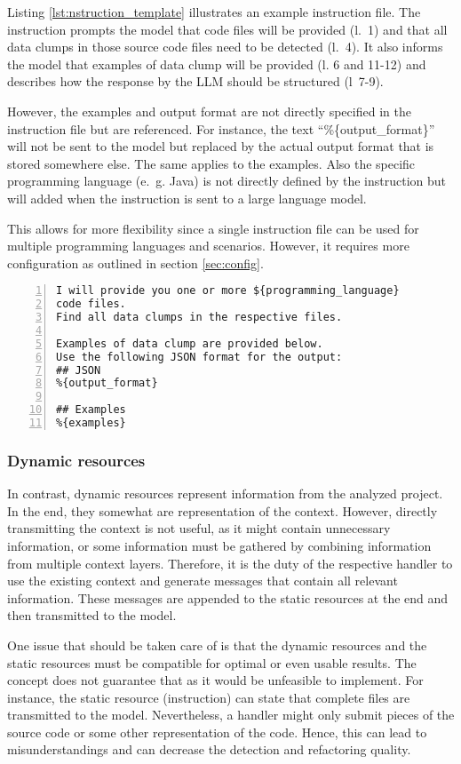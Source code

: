 Listing \ref{lst:nstruction_template} illustrates an example instruction file.  The instruction prompts the model that code files will be provided (l.~1) and that all data clumps in those source code files need to be detected (l.~4). It also informs the model that examples of data clump will be provided (l. 6 and 11-12) and describes how the response by the \ac{LLM} should be structured (l~7-9). 

However, the examples and output format are not directly specified in the instruction file but are referenced. For instance, the text \enquote{\%\{output\_format\}} will not be sent to the model but replaced by the actual output format that is stored somewhere else. The same applies to the examples. Also the specific programming language (e.~g. Java) is not directly defined by the instruction but will added when the instruction is sent to a large language model.

This allows for more flexibility since a single instruction file can be used for multiple programming languages and scenarios. However, it requires more configuration as outlined in section \ref{sec:config}.
\begin{lstlisting}[caption={Instruction file example}, label={lst:nstruction_template}, captionpos=b, numbers=left, ]
I will provide you one or more ${programming_language}
code files.
Find all data clumps in the respective files.

Examples of data clump are provided below.
Use the following JSON format for the output:
## JSON
%{output_format}

## Examples
%{examples}
\end{lstlisting}


\hfill
\subsubsection{Dynamic resources}

In contrast, dynamic resources represent information from the analyzed project. In the end, they somewhat are representation of the context. However, directly transmitting the context is not useful, as it might contain unnecessary information, or some information must be gathered by combining information from multiple context layers. Therefore, it is the duty of the respective handler to use the existing context and generate messages that contain all relevant information. These messages are appended to the static resources at the end and then transmitted to the model. 

One issue that should be taken care of is that the dynamic resources and the static resources must be compatible for optimal or even usable results. The concept does not guarantee that as it would be unfeasible to implement. For instance, the static resource (instruction) can state that complete files are transmitted to the model. Nevertheless, a handler might only submit pieces of the source code or some other representation of the code. Hence,  this can lead to misunderstandings and can decrease the detection and refactoring quality. 
